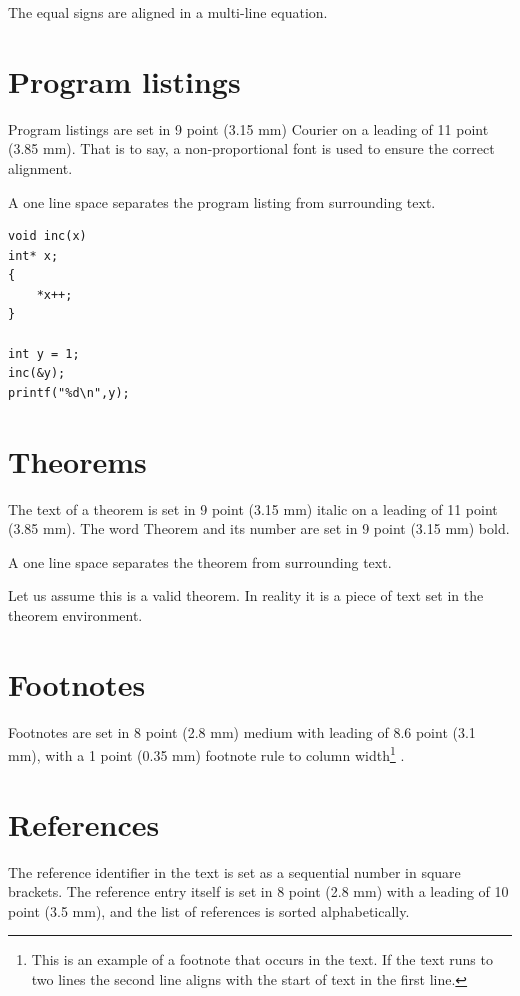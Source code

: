 \documentclass{ecai}  %
\begin{document}
The equal signs are aligned in a multi-line equation.

\section{Program listings}
Program listings are set in 9 point (3.15 mm) Courier on a
leading of 11 point (3.85 mm). That is to say, a non-proportional
font is used to ensure the correct alignment.

A one line space separates the program listing from surrounding text.

\begin{verbatim}
void inc(x)
int* x;
{
    *x++;
}

int y = 1;
inc(&y);
printf("%d\n",y);
\end{verbatim}

\section{Theorems}
The text of a theorem is set in 9 point (3.15 mm) italic on a
leading of 11 point (3.85 mm). The word Theorem and its number
are set in 9 point (3.15 mm) bold.

A one line space separates the theorem from surrounding text.

\begin{theorem}
Let us assume this is a valid theorem. In reality it is a piece
of text set in the theorem environment.
\end{theorem}

\section{Footnotes}
Footnotes are set in 8 point (2.8 mm) medium with leading of 8.6 point (3.1
mm), with a 1 point (0.35 mm) footnote rule to column
width\footnote{This is an example of a footnote that occurs in
the text. If the text runs to two lines the second line aligns
with the start of text in the first line.} .

\section{References}
The reference identifier in the text is set as a sequential number in square brackets. The reference entry itself is set in 8 point (2.8 mm) with a leading of 10 point (3.5 mm), and the list of references is sorted alphabetically.
\end{document}
